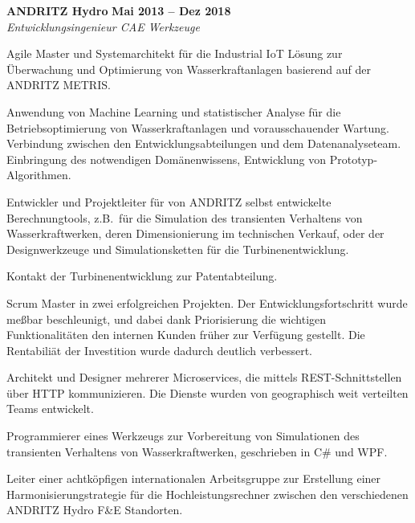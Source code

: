\documentclass[line,11pt,a4paper]{../resume}
\begin{document}
\begin{resume}
\textbf{ANDRITZ Hydro} \hfill \textbf{Mai 2013 -- Dez 2018}
\vspace{2mm}\\\vspace{1mm}%
\textsl{Entwicklungsingenieur CAE Werkzeuge}\\
\begin{list2}
  \item Agile Master und Systemarchitekt für die Industrial IoT Lösung zur
    Überwachung und Optimierung von Wasserkraftanlagen basierend auf der
    ANDRITZ METRIS.

  \item Anwendung von Machine Learning und statistischer Analyse für die
    Betriebsoptimierung von Wasserkraftanlagen und vorausschauender Wartung.
    Verbindung zwischen den Entwicklungsabteilungen und dem Datenanalyseteam.
    Einbringung des notwendigen Domänenwissens, Entwicklung von
    Prototyp-Algorithmen.

  \item Entwickler und Projektleiter für von ANDRITZ selbst entwickelte
    Berechnungtools, z.B.\ für die Simulation des transienten Verhaltens von
    Wasserkraftwerken, deren Dimensionierung im technischen Verkauf, oder der
    Designwerkzeuge und Simulationsketten für die Turbinenentwicklung.

  \item Kontakt der Turbinenentwicklung zur Patentabteilung.

  \item Scrum Master in zwei erfolgreichen Projekten. Der
    Entwicklungsfortschritt wurde me{\ss}bar beschleunigt, und dabei dank
    Priorisierung die wichtigen Funktionalitäten den internen Kunden früher zur
    Verfügung gestellt. Die Rentabiliät der Investition wurde dadurch deutlich
    verbessert.

  \item Architekt und Designer mehrerer Microservices, die mittels
    REST-Schnittstellen über HTTP kommunizieren. Die Dienste wurden von
    geographisch weit verteilten Teams entwickelt.

  \item Programmierer eines Werkzeugs zur Vorbereitung von Simulationen des
    transienten Verhaltens von Wasserkraftwerken, geschrieben in C\# und WPF.

  \item Leiter einer achtköpfigen internationalen Arbeitsgruppe zur Erstellung
    einer Harmonisierungstrategie für die Hochleistungsrechner zwischen den
    verschiedenen ANDRITZ Hydro F\&E Standorten.
\end{list2}


\end{resume}
\end{document}
